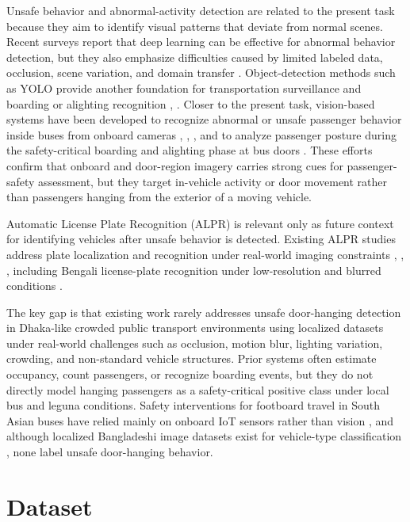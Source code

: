 \documentclass{article}
\begin{document}
Unsafe behavior and abnormal-activity detection are related to the present task because they aim to identify visual patterns that deviate from normal scenes. Recent surveys report that deep learning can be effective for abnormal behavior detection, but they also emphasize difficulties caused by limited labeled data, occlusion, scene variation, and domain transfer \cite{wastupranata2024abnormal}. Object-detection methods such as YOLO provide another foundation for transportation surveillance and boarding or alighting recognition \cite{redmon2016yolo}, \cite{yolo2024boarding}. Closer to the present task, vision-based systems have been developed to recognize abnormal or unsafe passenger behavior inside buses from onboard cameras \cite{tseng2022bus}, \cite{lin2024bus}, \cite{liu2025bus}, and to analyze passenger posture during the safety-critical boarding and alighting phase at bus doors \cite{ramirez2025posture}. These efforts confirm that onboard and door-region imagery carries strong cues for passenger-safety assessment, but they target in-vehicle activity or door movement rather than passengers hanging from the exterior of a moving vehicle.

Automatic License Plate Recognition (ALPR) is relevant only as future context for identifying vehicles after unsafe behavior is detected. Existing ALPR studies address plate localization and recognition under real-world imaging constraints \cite{anagnostopoulos2008license}, \cite{silva2018license}, \cite{du2013automatic}, including Bengali license-plate recognition under low-resolution and blurred conditions \cite{afrin2023bengali}.

The key gap is that existing work rarely addresses unsafe door-hanging detection in Dhaka-like crowded public transport environments using localized datasets under real-world challenges such as occlusion, motion blur, lighting variation, crowding, and non-standard vehicle structures. Prior systems often estimate occupancy, count passengers, or recognize boarding events, but they do not directly model hanging passengers as a safety-critical positive class under local bus and leguna conditions. Safety interventions for footboard travel in South Asian buses have relied mainly on onboard IoT sensors rather than vision \cite{indhumathi2024footboard}, and although localized Bangladeshi image datasets exist for vehicle-type classification \cite{tabassum2020poribohon}, none label unsafe door-hanging behavior.

\section{Dataset}
\end{document}
